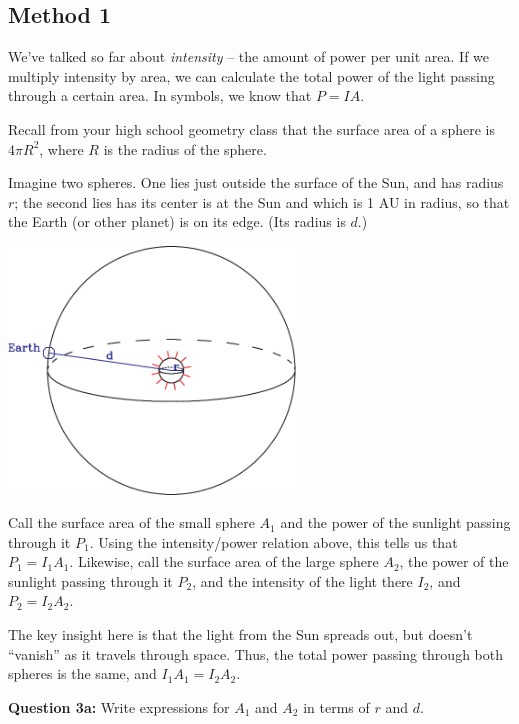 \documentclass[11pt]{article}
\begin{document}
\subsection*{Method 1}

We've talked so far about {\it intensity} -- the amount of power per unit area. If we multiply intensity by area, we can 
calculate the total power of the light passing through a certain area. In symbols, we know that $P=IA$.

Recall from your high school geometry class that the surface area of a sphere is $4\pi R^2$, where $R$ is the radius of 
the sphere.

Imagine two spheres. One lies just outside the surface of the Sun, and has radius $r$; the second lies
has its center is at the Sun and which is 1 AU in radius, so that the Earth (or other planet) 
is on its edge. (Its radius is $d$.) 

\begin{center}
\includegraphics[width=3in]{expand-crop.pdf}
\end{center}

Call the surface area of the small sphere $A_1$ and the power of the sunlight passing through it $P_1$. Using the intensity/power 
relation above, this tells us that $P_1=I_1 A_1$. Likewise, call the surface area of the large sphere $A_2$, the power of the 
sunlight passing through it $P_2$, and the intensity of the light there $I_2$, and $P_2 = I_2 A_2$.

The key insight here is that the light from the Sun spreads out, but doesn't ``vanish'' as it travels through space. Thus,
the total power passing through both spheres is the same, and $I_1 A_1 = I_2 A_2$.

{\bf Question 3a:} Write expressions for $A_1$ and $A_2$ in terms of $r$ and $d$.

\vspace*{5cm}
\end{document}
